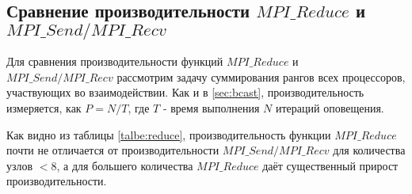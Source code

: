 		\FloatBarrier
			
		\subsection{Сравнение производительности  $ MPI\_Reduce $ и $ MPI\_Send / MPI\_Recv $}
			
			Для сравнения  производительности функций $ MPI\_Reduce $ и $ MPI\_Send / MPI\_Recv $
			рассмотрим задачу суммирования рангов всех процессоров, участвующих во взаимодействии. Как и в \ref{sec:bcast}, производительность измеряется, как $ P = N / T $, где $ T $ - время выполнения $ N $ итераций оповещения.
			
			Как видно из таблицы \ref{talbe:reduce}, производительность функции $ MPI\_Reduce $ почти не отличается от производительности $ MPI\_Send/MPI\_Recv $ для количества узлов $ < 8 $, а для большего количества $ MPI\_Reduce $  даёт существенный прирост производительности.
